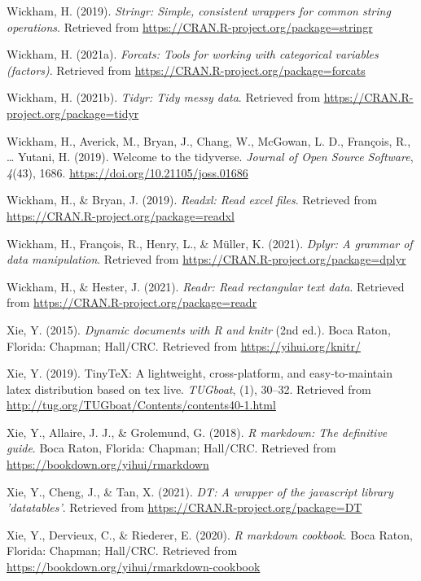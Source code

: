 \documentclass[
  english,
  man,floatsintext]{apa6}
\begin{document}
\leavevmode\hypertarget{ref-R-stringr}{}%
Wickham, H. (2019). \emph{Stringr: Simple, consistent wrappers for common string operations}. Retrieved from \url{https://CRAN.R-project.org/package=stringr}

\leavevmode\hypertarget{ref-R-forcats}{}%
Wickham, H. (2021a). \emph{Forcats: Tools for working with categorical variables (factors)}. Retrieved from \url{https://CRAN.R-project.org/package=forcats}

\leavevmode\hypertarget{ref-R-tidyr}{}%
Wickham, H. (2021b). \emph{Tidyr: Tidy messy data}. Retrieved from \url{https://CRAN.R-project.org/package=tidyr}

\leavevmode\hypertarget{ref-R-tidyverse}{}%
Wickham, H., Averick, M., Bryan, J., Chang, W., McGowan, L. D., François, R., \ldots{} Yutani, H. (2019). Welcome to the tidyverse. \emph{Journal of Open Source Software}, \emph{4}(43), 1686. \url{https://doi.org/10.21105/joss.01686}

\leavevmode\hypertarget{ref-R-readxl}{}%
Wickham, H., \& Bryan, J. (2019). \emph{Readxl: Read excel files}. Retrieved from \url{https://CRAN.R-project.org/package=readxl}

\leavevmode\hypertarget{ref-R-dplyr}{}%
Wickham, H., François, R., Henry, L., \& Müller, K. (2021). \emph{Dplyr: A grammar of data manipulation}. Retrieved from \url{https://CRAN.R-project.org/package=dplyr}

\leavevmode\hypertarget{ref-R-readr}{}%
Wickham, H., \& Hester, J. (2021). \emph{Readr: Read rectangular text data}. Retrieved from \url{https://CRAN.R-project.org/package=readr}

\leavevmode\hypertarget{ref-R-knitr}{}%
Xie, Y. (2015). \emph{Dynamic documents with R and knitr} (2nd ed.). Boca Raton, Florida: Chapman; Hall/CRC. Retrieved from \url{https://yihui.org/knitr/}

\leavevmode\hypertarget{ref-R-tinytex}{}%
Xie, Y. (2019). TinyTeX: A lightweight, cross-platform, and easy-to-maintain latex distribution based on tex live. \emph{TUGboat}, (1), 30--32. Retrieved from \url{http://tug.org/TUGboat/Contents/contents40-1.html}

\leavevmode\hypertarget{ref-R-rmarkdown_a}{}%
Xie, Y., Allaire, J. J., \& Grolemund, G. (2018). \emph{R markdown: The definitive guide}. Boca Raton, Florida: Chapman; Hall/CRC. Retrieved from \url{https://bookdown.org/yihui/rmarkdown}

\leavevmode\hypertarget{ref-R-DT}{}%
Xie, Y., Cheng, J., \& Tan, X. (2021). \emph{DT: A wrapper of the javascript library 'datatables'}. Retrieved from \url{https://CRAN.R-project.org/package=DT}

\leavevmode\hypertarget{ref-R-rmarkdown_b}{}%
Xie, Y., Dervieux, C., \& Riederer, E. (2020). \emph{R markdown cookbook}. Boca Raton, Florida: Chapman; Hall/CRC. Retrieved from \url{https://bookdown.org/yihui/rmarkdown-cookbook}

\endgroup


\clearpage
\renewcommand{\listfigurename}{Figure captions}
\end{document}
